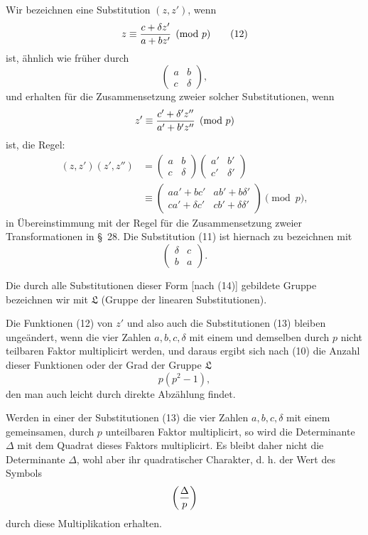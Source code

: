 \documentclass[11pt]{article}
\begin{document}
Wir bezeichnen eine Substitution $(z,z')$, wenn
\begin{equation}
 z\equiv {c+\delta z'\over a+bz'}\pmod p
\tag{12}
\end{equation}
ist, ähnlich wie früher durch
\begin{equation}
\begin{pmatrix}a&b\\ c&\delta\end{pmatrix},
\tag{13}
\end{equation}
und erhalten für die Zusammensetzung zweier solcher Substitutionen, wenn
\[
 z'\equiv {c'+\delta' z''\over a'+b'z''}\pmod p
\]
ist, die Regel:
\begin{equation}
\begin{aligned}
 (z,z')(z',z'')&=\begin{pmatrix}a&b\\ c&\delta\end{pmatrix}\begin{pmatrix}a'&b'\\ c'&\delta'\end{pmatrix}\\
&\equiv\begin{pmatrix}aa'+bc'&ab'+b\delta'\\ ca'+\delta c'&cb'+\delta\delta'\end{pmatrix}\pmod p,
\end{aligned}
\tag{14}
\end{equation}
in Übereinstimmung mit der Regel für die Zusammensetzung zweier Transformationen in \S~28. Die Substitution (11) ist hiernach zu bezeichnen mit
\[
\begin{pmatrix}\delta&c\\ b&a\end{pmatrix}.
\]

Die durch alle Substitutionen dieser Form [nach (14)] gebildete Gruppe bezeichnen wir mit $\mathfrak L$ (Gruppe der linearen Substitutionen).

Die Funktionen (12) von $z'$ und also auch die Substitutionen (13) bleiben ungeändert, wenn die vier Zahlen $a,b,c,\delta$ mit einem und demselben durch $p$ nicht teilbaren Faktor multiplicirt werden, und daraus ergibt sich nach (10) die Anzahl dieser Funktionen oder der Grad der Gruppe $\mathfrak L$
\begin{equation}
 p(p^2-1),
\tag{15}
\end{equation}
den man auch leicht durch direkte Abzählung findet.

Werden in einer der Substitutionen (13) die vier Zahlen $a,b,c,\delta$ mit einem gemeinsamen, durch $p$ unteilbaren Faktor multiplicirt, so wird die Determinante $\Delta$ mit dem Quadrat dieses Faktors multiplicirt. Es bleibt daher nicht die Determinante $\Delta$, wohl aber ihr quadratischer Charakter, d. h. der Wert des Symbols
\[
 \left({\Delta\over p}\right)
\]
durch diese Multiplikation erhalten.
\end{document}

